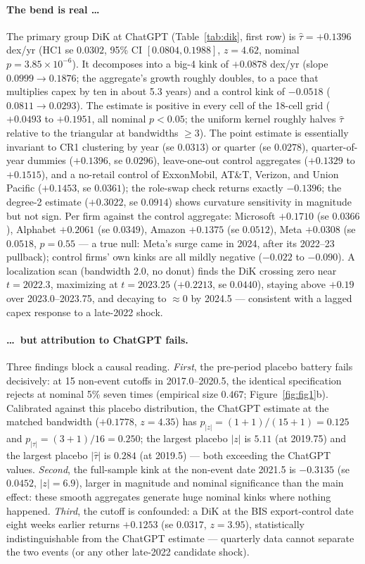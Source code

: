\documentclass[11pt]{article}
\begin{document}
\paragraph{The bend is real \ldots} The primary group DiK at ChatGPT
(Table~\ref{tab:dik}, first row) is $\hat\tau=+0.1396$ dex/yr (HC1 se
$0.0302$, 95\% CI $[0.0804, 0.1988]$, $z=4.62$, nominal
$p=3.85\times10^{-6}$). It decomposes into a big-4 kink of $+0.0878$ dex/yr
(slope $0.0999\to0.1876$; the aggregate's growth roughly doubles, to a pace
that multiplies capex by ten in about 5.3 years) and a control kink of
$-0.0518$ ($0.0811\to0.0293$). The estimate is positive in every cell of the
18-cell grid ($+0.0493$ to $+0.1951$, all nominal $p<0.05$; the uniform
kernel roughly halves $\hat\tau$ relative to the triangular at bandwidths
$\geq3$). The point estimate is essentially invariant to CR1 clustering by
year (se $0.0313$) or quarter (se $0.0278$), quarter-of-year dummies
($+0.1396$, se $0.0296$), leave-one-out control aggregates ($+0.1329$ to
$+0.1515$), and a no-retail control of ExxonMobil, AT\&T, Verizon, and Union
Pacific ($+0.1453$, se $0.0361$); the role-swap check returns exactly
$-0.1396$; the degree-2 estimate ($+0.3022$, se $0.0914$) shows curvature
sensitivity in magnitude but not sign. Per firm against the control
aggregate: Microsoft $+0.1710$ (se $0.0366$), Alphabet $+0.2061$ (se
$0.0349$), Amazon $+0.1375$ (se $0.0512$), Meta $+0.0308$ (se $0.0518$,
$p=0.55$ --- a true null: Meta's surge came in 2024, after its 2022--23
pullback); control firms' own kinks are all mildly negative ($-0.022$ to
$-0.090$). A localization scan (bandwidth 2.0, no donut) finds the DiK
crossing zero near $t=2022.3$, maximizing at $t=2023.25$ ($+0.2213$, se
$0.0440$), staying above $+0.19$ over 2023.0--2023.75, and decaying to
$\approx0$ by 2024.5 --- consistent with a lagged capex response to a
late-2022 shock.

\paragraph{\ldots\ but attribution to ChatGPT fails.} Three findings block a
causal reading. \emph{First}, the pre-period placebo battery fails
decisively: at 15 non-event cutoffs in 2017.0--2020.5, the identical
specification rejects at nominal 5\% seven times (empirical size $0.467$;
Figure~\ref{fig:fig1}b). Calibrated against this placebo distribution, the
ChatGPT estimate at the matched bandwidth ($+0.1778$, $z=4.35$) has
$p_{|z|}=(1+1)/(15+1)=0.125$ and $p_{|\tau|}=(3+1)/16=0.250$; the largest
placebo $|z|$ is $5.11$ (at 2019.75) and the largest placebo $|\hat\tau|$ is
$0.284$ (at 2019.5) --- both exceeding the ChatGPT values. \emph{Second}, the
full-sample kink at the non-event date 2021.5 is $-0.3135$ (se $0.0452$,
$|z|=6.9$), larger in magnitude and nominal significance than the main
effect: these smooth aggregates generate huge nominal kinks where nothing
happened. \emph{Third}, the cutoff is confounded: a DiK at the BIS
export-control date eight weeks earlier returns $+0.1253$ (se $0.0317$,
$z=3.95$), statistically indistinguishable from the ChatGPT estimate ---
quarterly data cannot separate the two events (or any other late-2022
candidate shock).
\end{document}
